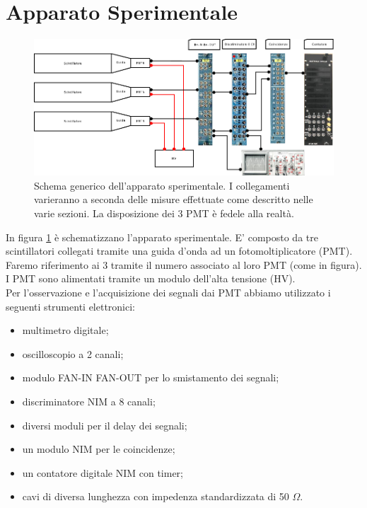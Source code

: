 \documentclass[a4paper,10pt]{article}
\begin{document}
\section{Apparato Sperimentale}
\begin{figure}
\centering
\includegraphics[width=\textwidth]{fig/apparato_sperimentale}
\caption{Schema generico dell'apparato sperimentale. I collegamenti varieranno a seconda delle misure effettuate come descritto nelle varie sezioni. La disposizione dei 3 PMT è fedele alla realtà. }
\label{fig:apparato}
\end{figure}

In figura \ref{fig:apparato} è schematizzano l'apparato sperimentale. E' composto da tre scintillatori collegati tramite una guida d'onda ad un fotomoltiplicatore (PMT). Faremo riferimento ai 3 tramite il numero associato al loro PMT (come in figura).
\\I PMT sono alimentati tramite un modulo dell'alta tensione (HV). 
\\Per l'osservazione e l'acquisizione dei segnali dai PMT abbiamo utilizzato i seguenti strumenti elettronici:
\begin{itemize}
\item multimetro digitale;
\item oscilloscopio a 2 canali;
\item modulo FAN-IN FAN-OUT per lo smistamento dei segnali;
\item discriminatore NIM a 8 canali;
\item diversi moduli per il delay dei segnali;
\item un modulo NIM per le coincidenze;
\item un contatore digitale NIM con timer;
\item cavi di diversa lunghezza con impedenza standardizzata di 50 $\Omega$.
\end{itemize}


\label{sec:apparato} 
\end{document}
